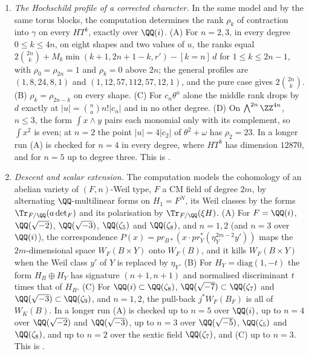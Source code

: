 \begin{enumerate}[label=\textup{(\Roman*)},leftmargin=*]
\item \emph{The Hochschild profile of a corrected character.} In the same
  model and by the same torus blocks, the computation determines the rank
  $\rho_{k}$ of contraction into $\gamma$ on every $HT^{k}$, exactly over
  $\QQ(i)$. (A) For $n=2,3$, in every degree $0\le k\le4n$, on eight shapes and two values of $u$, the ranks equal
  $2\binom{2n}{k}+M_{k}\min(k+1,2n+1-k,r')-[k=n]\,d$ for $1\le k\le2n-1$, with
  $\rho_{0}=\rho_{2n}=1$ and $\rho_{k}=0$ above $2n$; the general profiles are
  $(1,8,24,8,1)$ and $(1,12,57,112,57,12,1)$, and the pure case gives
  $2\binom{2n}{k}$. (B) $\rho_{k}=\rho_{2n-k}$ on every shape. (C) For
  $c_{n}\theta^{n}$ alone the middle rank drops by $d$ exactly at
  $|u|=\binom{n}{a}n!|c_{n}|$ and in no other degree. (D) On
  $\bigwedge^{2n}\ZZ^{4n}$, $n\le3$, the form $\int x\wedge y$ pairs each
  monomial only with its complement, so $\int x^{2}$ is even; at $n=2$ the
  point $|u|=4|c_{2}|$ of $\theta^{2}+\omega$ has $\rho_{2}=23$. In a longer
  run (A) is checked for $n=4$ in every degree, where $HT^{8}$ has
  dimension $12870$, and for $n=5$ up to degree three. This is
  .

\item \emph{Descent and scalar extension.} The computation models the
  cohomology of an abelian variety of $(F,n)$-Weil type, $F$ a CM field of
  degree $2m$, by alternating $\QQ$-multilinear forms on $H_{1}=F^{N}$, its
  Weil classes by the forms $\Tr_{F/\QQ}(a\det_{F})$ and its
  polarisation by $\Tr_{F/\QQ}(\xi H)$. (A) For $F=\QQ(i)$, $\QQ(\sqrt{-2})$,
  $\QQ(\sqrt{-3})$, $\QQ(\zeta_{5})$ and $\QQ(\zeta_{8})$, and $n=1,2$ (and
  $n=3$ over $\QQ(i)$), the correspondence
  $P(x)=pr_{B*}(x\cdot pr_{Y}^{*}(\eta_{Y}^{2m-2}y'))$ maps the $2m$-dimensional
  space $W_{F}(B\times Y)$ onto $W_{F}(B)$, and it kills $W_{F}(B\times Y)$
  when the Weil class $y'$ of $Y$ is replaced by $\eta_{Y}$. (B) For
  $H_{Y}=\mathrm{diag}(1,-t)$ the form $H_{B}\oplus H_{Y}$ has signature
  $(n+1,n+1)$ and normalised discriminant $t$ times that of $H_{B}$. (C) For
  $\QQ(i)\subset\QQ(\zeta_{8})$, $\QQ(\sqrt{-7})\subset\QQ(\zeta_{7})$ and
  $\QQ(\sqrt{-3})\subset\QQ(\zeta_{9})$, and $n=1,2$, the pull-back
  $j^{*}W_{F}(B_{F})$ is all of $W_{K}(B)$. In a longer run (A) is checked up
  to $n=5$ over $\QQ(i)$, up to $n=4$ over $\QQ(\sqrt{-2})$ and
  $\QQ(\sqrt{-3})$, up to $n=3$ over $\QQ(\sqrt{-5})$, $\QQ(\zeta_{5})$ and
  $\QQ(\zeta_{8})$, and up to $n=2$ over the sextic field $\QQ(\zeta_{7})$, and
  (C) up to $n=3$. This is .


\end{enumerate}

